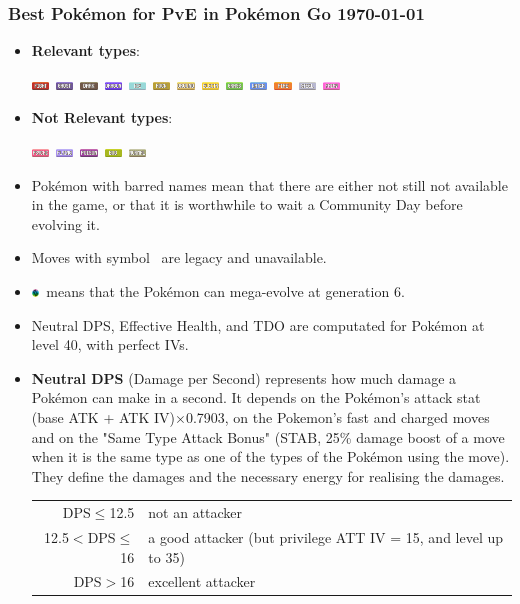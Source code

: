 \documentclass[12pt]{beamer}
\newcommand{\fightingfull}{\includegraphics[height=0.2cm]{../../images/type/full/Fighting.png}}
\newcommand{\bugfull}{\includegraphics[height=0.2cm]{../../images/type/full/Bug.png}}
\newcommand{\darkfull}{\includegraphics[height=0.2cm]{../../images/type/full/Dark.png}}
\newcommand{\electricfull}{\includegraphics[height=0.2cm]{../../images/type/full/Electric.png}}
\newcommand{\fairyfull}{\includegraphics[height=0.2cm]{../../images/type/full/Fairy.png}}
\newcommand{\firefull}{\includegraphics[height=0.2cm]{../../images/type/full/Fire.png}}
\newcommand{\flyingfull}{\includegraphics[height=0.2cm]{../../images/type/full/Flying.png}}
\newcommand{\ghostfull}{\includegraphics[height=0.2cm]{../../images/type/full/Ghost.png}}
\newcommand{\dragonfull}{\includegraphics[height=0.2cm]{../../images/type/full/Dragon.png}}
\newcommand{\grassfull}{\includegraphics[height=0.2cm]{../../images/type/full/Grass.png}}
\newcommand{\groundfull}{\includegraphics[height=0.2cm]{../../images/type/full/Ground.png}}
\newcommand{\icefull}{\includegraphics[height=0.2cm]{../../images/type/full/Ice.png}}
\newcommand{\normalfull}{\includegraphics[height=0.2cm]{../../images/type/full/Normal.png}}
\newcommand{\psychicfull}{\includegraphics[height=0.2cm]{../../images/type/full/Psychic.png}}
\newcommand{\rockfull}{\includegraphics[height=0.2cm]{../../images/type/full/Rock.png}}
\newcommand{\waterfull}{\includegraphics[height=0.2cm]{../../images/type/full/Water.png}}
\newcommand{\poisonfull}{\includegraphics[height=0.2cm]{../../images/type/full/Poison.png}}
\newcommand{\steelfull}{\includegraphics[height=0.2cm]{../../images/type/full/Steel.png}}
\newcommand{\megaevol}{\includegraphics[width=0.2cm]{../../images/megaevolve}}
\begin{document}
\begin{frame}
\frametitle{Best Pok\'emon for PvE in Pok\'emon Go \hspace{3.2cm} \today}

\begin{block}{}
\begin{footnotesize}

\begin{itemize}
  \item \textbf{Relevant types}: 
  
  \begin{center}
  \fightingfull ~\ghostfull ~\darkfull ~\dragonfull ~\icefull ~\rockfull ~\groundfull ~\electricfull ~\grassfull ~\waterfull ~\firefull ~\steelfull ~\fairyfull 
\end{center}
 \item \textbf{Not Relevant types}:
 \begin{center}
   \psychicfull ~\flyingfull ~\poisonfull ~\bugfull ~\normalfull
\end{center}
  \item Pok\'emon with barred names mean that there are either not still not available in the game, or that it is worthwhile to wait a Community Day before evolving it.
  \item Moves with symbol \dag~are legacy and unavailable.
  \item \megaevol~means that the Pok\'emon can mega-evolve at generation 6.
  \item Neutral DPS, Effective Health, and TDO are computated for Pok\'emon at level 40, with perfect IVs. 
  \item \textbf{Neutral DPS} (Damage per Second) represents how much damage a Pok\'emon can make in a second. It depends on the Pok\'emon's attack stat (base ATK + ATK IV)$\times$0.7903, on the Pokemon's fast and charged moves and on the "Same Type Attack Bonus" (STAB, 25\% damage boost of a move when it is the same type as one of the types of the Pokémon using the move). They define the damages and the necessary energy for realising the damages.
\begin{center}
\begin{tabular}{rl}
DPS$\leq$12.5   &  not an attacker  \\
12.5$<$DPS$\leq$16   &  a good attacker (but privilege ATT IV = 15, and level up to 35)  \\
DPS$>$16   &  excellent attacker  \\
\end{tabular}
\end{center}

\end{itemize}
\end{footnotesize}
\end{block}
\end{frame}
\end{document}

